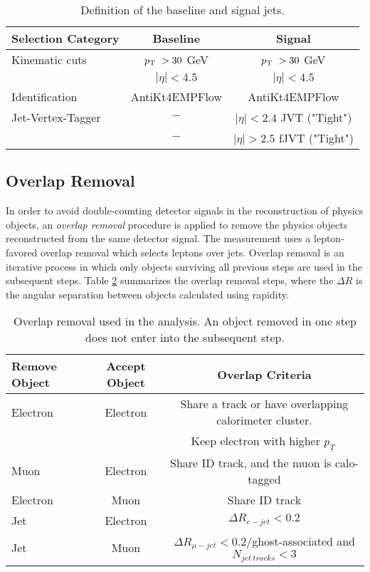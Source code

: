 \begin{table}[ht]
    \centering
    \caption{Definition of the baseline and signal jets.\label{tab:jets}}
        \begin{tabular}{|| l || c | c ||}
        \hline
        Selection Category & \textbf{Baseline} & \textbf{Signal} \\
        \hline\hline
        Kinematic cuts & $p_{\textrm{T} ~} > 30$ GeV & $p_{\textrm{T} ~} > 30$ GeV \\
             & $|\eta| < 4.5$ & $|\eta| < 4.5$\\
        \hline 
        Identification & AntiKt4EMPFlow & AntiKt4EMPFlow\\
        \hline
        Jet-Vertex-Tagger & $-$ & $ |\eta| < 2.4 $ JVT ("Tight")\\
                & $-$ & $|\eta| > 2.5 $ fJVT ("Tight")\\
        \hline
    \end{tabular}
\end{table}

\subsection{Overlap Removal}
\label{subsec:OR}

In order to avoid double-counting detector signals in the reconstruction of physics objects, an \textit{overlap removal} procedure is applied to remove the physics objects reconstructed from the same detector signal. The measurement uses a lepton-favored overlap removal which selects leptons over jets. Overlap removal is an iterative process in which only objects surviving all previous steps are used in the subsequent steps. Table \ref{tab:overlap_removal} summarizes the overlap removal steps, where the $\Delta R$ is the angular separation between objects calculated using rapidity.

\begin{table}[ht]
    \centering
        \caption{Overlap removal used in the analysis. An object removed in one step does not enter into the subsequent step. \label{tab:overlap_removal}}
        \begin{tabular}{|| l || c | c ||}
        \hline
        Remove Object & Accept Object & Overlap Criteria \\
        \hline\hline
        Electron & Electron & Share a track or have overlapping calorimeter cluster.\\
                &       & Keep electron with higher $p_{T}~$\\
        \hline
        Muon & Electron & Share ID track, and the muon is calo-tagged\\
        \hline
        Electron & Muon & Share ID track\\
        \hline
        Jet & Electron & $\Delta R_{e-jet} < 0.2$ \\
        \hline 
        Jet & Muon & $\Delta R_{\mu-jet} < 0.2/$ghost-associated and $N_{jet~tracks} < 3$\\
        \hline
    \end{tabular}
\end{table}